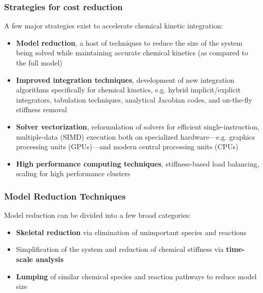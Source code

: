 \documentclass{beamer}
\begin{document}
\begin{frame}
 \frametitle{Strategies for cost reduction}
 A few major strategies exist to accelerate chemical kinetic integration:
 \begin{itemize}
  \item \textbf{Model reduction}, a host of techniques to reduce the size of the system being solved while maintaining accurate chemical kinetics (as compared to the full model)
  \item \textbf{Improved integration techniques}, development of new integration algorithms specifically for chemical kinetics, e.g. hybrid implicit\slash explicit integrators, tabulation techniques, analytical Jacobian codes, and on-the-fly stiffness removal
  \item \textbf{Solver vectorization}, reformulation of solvers for efficient single-instruction, multiple-data (SIMD) execution both on specialized hardware---e.g. graphics processing units (GPUs)---and modern central processing units (CPUs)
  \item \textbf{High performance computing techniques}, stiffness-based load balancing, scaling for high performance clusters
 \end{itemize}
\end{frame}

\begin{frame}
 \frametitle{Model Reduction Techniques}
 Model reduction can be divided into a few broad categories:
 \begin{itemize}
  \item \textbf{Skeletal reduction} via elimination of unimportant species and reactions
  \item Simplification of the system and reduction of chemical stiffness via \textbf{time-scale analysis}
  \item \textbf{Lumping} of similar chemical species and reaction pathways to reduce model size
 \end{itemize}
\end{frame}
\end{document}
